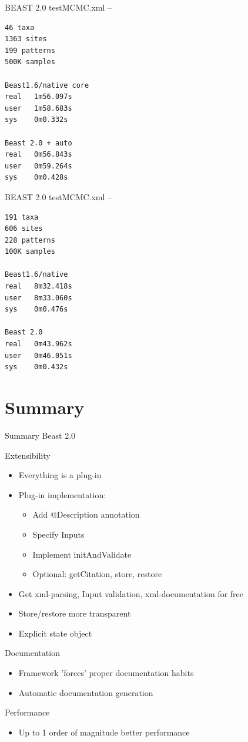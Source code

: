 \documentclass{beamer}
\theoremstyle{definition}
\begin{document}
\begin{frame}[containsverbatim]
{\Large BEAST 2.0}
testMCMC.xml -- 

\begin{verbatim}
46 taxa
1363 sites
199 patterns
500K samples 

Beast1.6/native core
real   1m56.097s
user   1m58.683s
sys    0m0.332s

Beast 2.0 + auto
real   0m56.843s
user   0m59.264s
sys    0m0.428s
\end{verbatim}
\end{frame}

\begin{frame}[containsverbatim]
{\Large BEAST 2.0}
testMCMC.xml -- 

\begin{verbatim}
191 taxa
606 sites
228 patterns
100K samples

Beast1.6/native
real   8m32.418s
user   8m33.060s
sys    0m0.476s

Beast 2.0
real   0m43.962s
user   0m46.051s
sys    0m0.432s
\end{verbatim}
\end{frame}


\section{Summary}
\begin{frame}{Summary Beast 2.0}

Extensibility
\begin{itemize}
\item Everything is a plug-in
\item Plug-in implementation:
\begin{itemize}
\item Add @Description annotation
\item Specify Inputs
\item Implement initAndValidate
\item Optional: getCitation, store, restore
\end{itemize}
\item Get xml-parsing, Input validation, xml-documentation for free
\item Store/restore more transparent
\item Explicit state object
\end{itemize}

Documentation
\begin{itemize}
\item Framework 'forces' proper documentation habits
\item Automatic documentation generation
\end{itemize}

Performance
\begin{itemize}
\item Up to 1 order of magnitude better performance
\end{itemize}
\end{frame}
\end{document}
